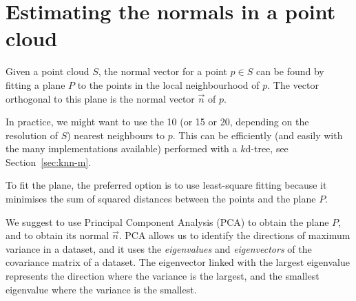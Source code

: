 
\graphicspath{{appendices/normalplane/figs/}}

\chapter{Estimating the normals in a point cloud}%
\label{app:normalplane}

Given a point cloud $S$, the normal vector for a point $p \in S$ can be found by fitting a plane $P$ to the points in the local neighbourhood of $p$. 
The vector orthogonal to this plane is the normal vector $\vec{n}$ of $p$.

In practice, we might want to use the 10 (or 15 or 20, depending on the resolution of $S$) nearest neighbours to $p$.
This can be efficiently (and easily with the many implementations available) performed with a $k$d-tree, see Section~\ref{sec:knn-m}.

To fit the plane, the preferred option is to use least-square fitting because it minimises the sum of squared distances between the points and the plane $P$.

We suggest to use Principal Component Analysis (PCA) 
%
to obtain the plane $P$, and to obtain its normal $\vec{n}$.
PCA allows us to identify the directions of maximum variance in a dataset, and it uses the \emph{eigenvalues} and \emph{eigenvectors} of the covariance matrix of a dataset.
%
The eigenvector linked with the largest eigenvalue represents the direction where the variance is the largest, and the smallest eigenvalue where the variance is the smallest.

%

